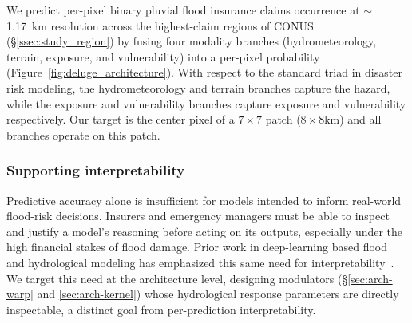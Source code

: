 We predict per-pixel binary pluvial flood insurance claims occurrence at $\sim$1.17~km resolution across the highest-claim regions of CONUS (\S\ref{ssec:study_region}) by fusing four modality branches (hydrometeorology, terrain, exposure, and vulnerability) into a per-pixel probability (Figure~\ref{fig:deluge_architecture}).
%
With respect to the standard triad in disaster risk modeling, the hydrometeorology and terrain branches capture the hazard, while the exposure and vulnerability branches capture exposure and vulnerability respectively.
%
Our target is the center pixel of a $7 \times 7$ patch (\tsim$8\times8$km) and all branches operate on this patch.
\subsubsection{Supporting interpretability}
Predictive accuracy alone is insufficient for models intended to inform real-world flood-risk decisions.
%
Insurers and emergency managers must be able to inspect and justify a model's reasoning before acting on its outputs, especially under the high financial stakes of flood damage.
%
Prior work in deep-learning based flood and hydrological modeling has emphasized this same need for interpretability~\cite{taghizadeh_interpretable_2024, li_interpretable_2024, lee_improving_2024}.
%
We target this need at the architecture level, designing modulators (\S\ref{sec:arch-warp} and \ref{sec:arch-kernel}) whose hydrological response parameters are directly inspectable, a distinct goal from per-prediction interpretability.

